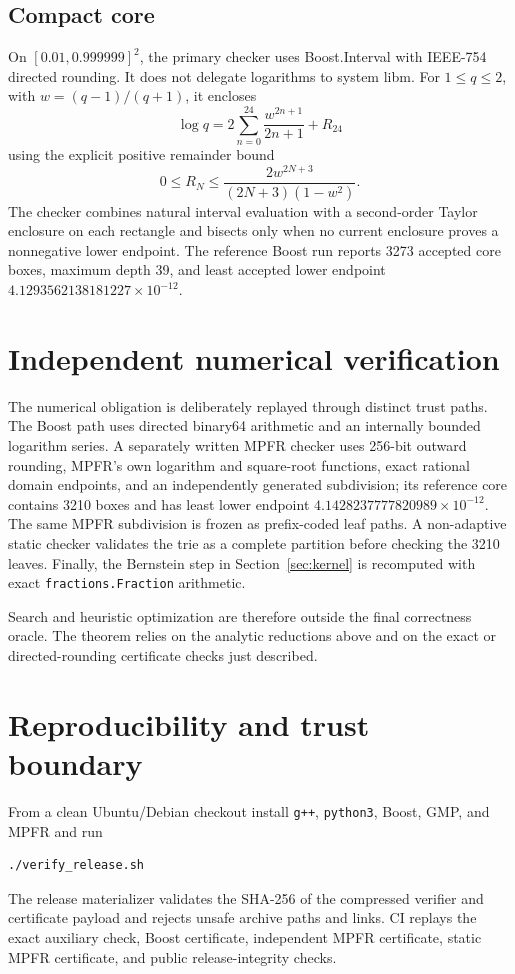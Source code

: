 \documentclass[11pt]{article}
\begin{document}
\subsection{Compact core}
On $[0.01,0.999999]^2$, the primary checker uses Boost.Interval with IEEE-754
directed rounding. It does not delegate logarithms to system libm. For
$1\le q\le2$, with $w=(q-1)/(q+1)$, it encloses
\[
\log q=2\sum_{n=0}^{24}\frac{w^{2n+1}}{2n+1}+R_{24}
\]
using the explicit positive remainder bound
\[
0\le R_N\le\frac{2w^{2N+3}}{(2N+3)(1-w^2)}.
\]
The checker combines natural interval evaluation with a second-order Taylor
enclosure on each rectangle and bisects only when no current enclosure proves
a nonnegative lower endpoint. The reference Boost run reports 3273 accepted
core boxes, maximum depth 39, and least accepted lower endpoint
$4.1293562138181227\times10^{-12}$.

\section{Independent numerical verification}

The numerical obligation is deliberately replayed through distinct trust
paths. The Boost path uses directed binary64 arithmetic and an internally
bounded logarithm series. A separately written MPFR checker uses 256-bit
outward rounding, MPFR's own logarithm and square-root functions, exact
rational domain endpoints, and an independently generated subdivision; its
reference core contains 3210 boxes and has least lower endpoint
$4.1428237777820989\times10^{-12}$. The same MPFR subdivision is frozen as
prefix-coded leaf paths. A non-adaptive static checker validates the trie as a
complete partition before checking the 3210 leaves. Finally, the Bernstein
step in Section~\ref{sec:kernel} is recomputed with exact
\texttt{fractions.Fraction} arithmetic.

Search and heuristic optimization are therefore outside the final correctness
oracle. The theorem relies on the analytic reductions above and on the exact
or directed-rounding certificate checks just described.

\section{Reproducibility and trust boundary}

From a clean Ubuntu/Debian checkout install \texttt{g++}, \texttt{python3},
Boost, GMP, and MPFR and run
\begin{verbatim}
./verify_release.sh
\end{verbatim}
The release materializer validates the SHA-256 of the compressed verifier and
certificate payload and rejects unsafe archive paths and links. CI replays the
exact auxiliary check, Boost certificate, independent MPFR certificate,
static MPFR certificate, and public release-integrity checks.
\end{document}
